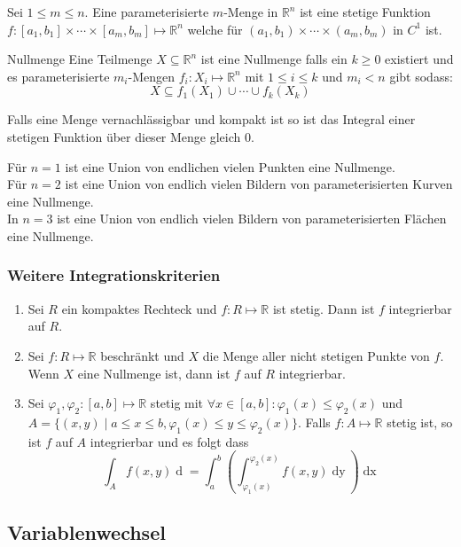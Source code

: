 \documentclass[a4paper,10pt]{article}
\def\R{\mathbb{R}}
\begin{document}
Sei $1 \leq m \leq n$. Eine parameterisierte $m$-Menge in $\R^n$ ist eine stetige Funktion $f: [a_1, b_1] \times \cdots \times [a_m, b_m] \mapsto \R^n$ welche für $(a_1, b_1) \times \cdots \times (a_m, b_m)$ in $C^1$ ist. 

\begin{mainbox}{Nullmenge}
  Eine Teilmenge $X \subseteq \R^n$ ist eine Nullmenge falls ein $k \geq 0$ existiert und es parameterisierte $m_i$-Mengen $f_i: X_i \mapsto \R^n$ mit $1 \leq i \leq k$ und $m_i < n$ gibt sodass:
  $$X \subseteq f_1(X_1) \cup \cdots \cup f_k(X_k)$$

  Falls eine Menge vernachlässigbar und kompakt ist so ist das Integral einer stetigen Funktion über dieser Menge gleich $0$.
\end{mainbox}

Für $n=1$ ist eine Union von endlichen vielen Punkten eine Nullmenge.\\
Für $n=2$ ist eine Union von endlich vielen Bildern von parameterisierten Kurven eine Nullmenge.\\
In $n=3$ ist eine Union von endlich vielen Bildern von parameterisierten Flächen eine Nullmenge.

\subsubsection*{Weitere Integrationskriterien}
\begin{enumerate}
  \item Sei \(R\) ein kompaktes Rechteck und \(f: R \mapsto \R\) ist stetig. Dann ist \(f\) integrierbar auf \(R\).
  \item Sei \(f: R \mapsto \R\) beschränkt und \(X\) die Menge aller nicht stetigen Punkte von \(f\). Wenn \(X\) eine Nullmenge ist, dann ist \(f\) auf \(R\) integrierbar.
  \item Sei \(\varphi_1, \varphi_2: \left[a,b\right]\mapsto \R\) stetig mit \(\forall x \in \left[a,b\right]: \varphi_1(x) \le \varphi_2(x)\) und \(A = \{(x,y)\mid a\le x \le b, \varphi_1(x) \le y \le \varphi_2(x)\}\). Falls \(f: A \mapsto \R\) stetig ist, so ist \(f\) auf \(A\) integrierbar und es folgt dass
  \[\int_A f(x,y) \mathop{d(x,y)} = \int_a^b \left(\int_{\varphi_1(x)}^{\varphi_2(x)} f(x,y) \mathop{dy}\right) \mathop{dx}\]
\end{enumerate}

\subsection{Variablenwechsel}
\end{document}
